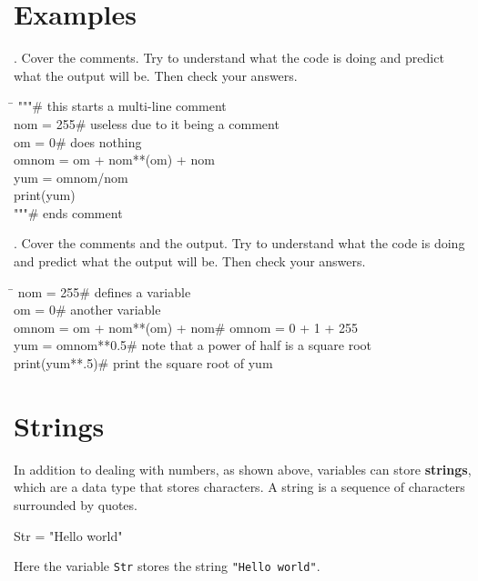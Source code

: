 \documentclass{article}
\newcommand{\define}[1]{\begin{center}\ttfamily #1\end{center}}
\begin{document}
\section{Examples}
. Cover the comments. Try to understand what the code is doing and predict what the output will be. Then check your answers.
\vspace{1 mm}
\begin{tcolorbox}
	\ttfamily
	\begin{tabbing}
		\hspace{3.25 in}\=\hspace{3.25 in} \kill
		"""\>\# this starts a multi-line comment\\
		nom = 255\>\# useless due to it being a comment\\
		om = 0\>\# does nothing\\
		omnom = om + nom**(om) + nom\>\\
		yum = omnom/nom\>\\
		print(yum)\>\\
		"""\>\# ends comment
	\end{tabbing}
\end{tcolorbox}
\begin{tcolorbox}[colback=output]
	\ttfamily
\end{tcolorbox}
\vspace{.25 cm}
. Cover the comments and the output. Try to understand what the code is doing and predict what the output will be. Then check your answers.
\vspace{1 mm}
\begin{tcolorbox}
	\ttfamily
	\begin{tabbing}
		\hspace{3.25 in}\=\hspace{3.25 in} \kill
		nom = 255\>\# defines a variable\\
		om = 0\>\# another variable\\
		omnom = om + nom**(om) + nom\>\# omnom = 0 + 1 + 255\\
		yum = omnom**0.5\>\# note that a power of half is a square root\\
		print(yum**.5)\>\# print the square root of yum
	\end{tabbing}
\end{tcolorbox}
\begin{tcolorbox}[colback=output]
	\ttfamily
	4
\end{tcolorbox}
\section{Strings}
In addition to dealing with numbers, as shown above, variables can store \textbf{strings}, which are a data type that stores characters. A string is a sequence of characters surrounded by quotes.
\define{Str = "Hello world"}
Here the variable \texttt{Str} stores the string \texttt{"Hello world"}.
\end{document}
